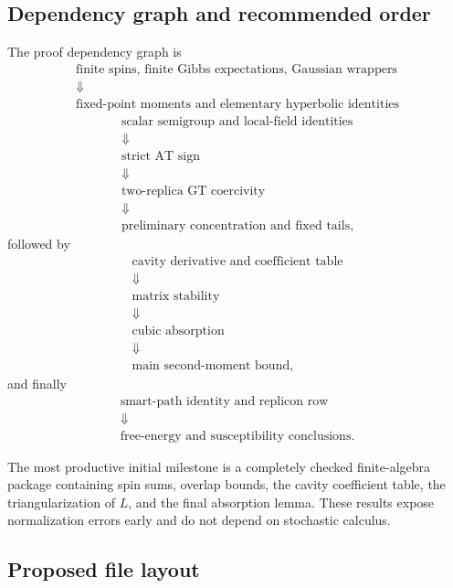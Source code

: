 \documentclass[11pt]{article}
\numberwithin{equation}{section}
\newcommand{\1}{\mathbf 1}
\begin{document}
\subsection{Dependency graph and recommended order}

The proof dependency graph is
\[
\begin{array}{c}
\text{finite spins, finite Gibbs expectations, Gaussian wrappers}\\[-0.2em]
\Downarrow\\[-0.2em]
\text{fixed-point moments and elementary hyperbolic identities}
\end{array}
\]
\[
\begin{array}{c}
\text{scalar semigroup and local-field identities}\\[-0.2em]
\Downarrow\\[-0.2em]
\text{strict AT sign}\\[-0.2em]
\Downarrow\\[-0.2em]
\text{two-replica GT coercivity}\\[-0.2em]
\Downarrow\\[-0.2em]
\text{preliminary concentration and fixed tails},
\end{array}
\]
followed by
\[
\begin{array}{c}
\text{cavity derivative and coefficient table}\\[-0.2em]
\Downarrow\\[-0.2em]
\text{matrix stability}\\[-0.2em]
\Downarrow\\[-0.2em]
\text{cubic absorption}\\[-0.2em]
\Downarrow\\[-0.2em]
\text{main second-moment bound},
\end{array}
\]
and finally
\[
\begin{array}{c}
\text{smart-path identity and replicon row}\\[-0.2em]
\Downarrow\\[-0.2em]
\text{free-energy and susceptibility conclusions}.
\end{array}
\]

The most productive initial milestone is a completely checked
finite-algebra package containing spin sums, overlap bounds, the cavity
coefficient table, the triangularization of $L$, and the final absorption
lemma.  These results expose normalization errors early and do not depend on
stochastic calculus.

\subsection{Proposed file layout}
\end{document}
